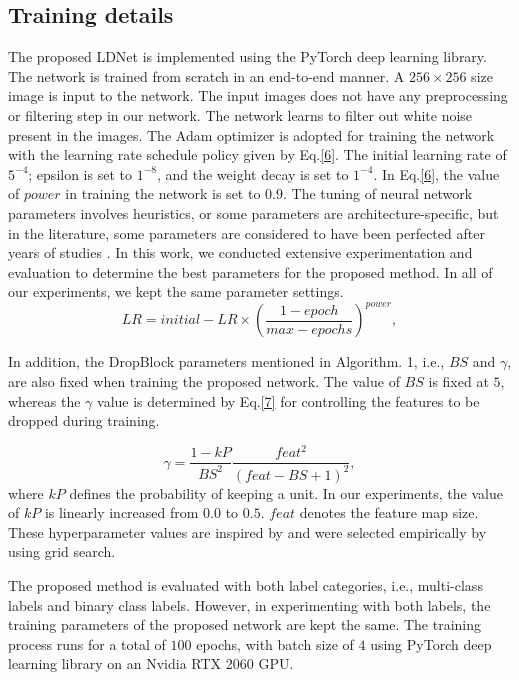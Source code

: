 \documentclass[journal]{IEEEtran}
\begin{document}
\subsection{Training details}
The proposed LDNet is implemented using the PyTorch deep learning library. The network is trained from scratch in an end-to-end manner. A $256 \times 256$ size image is input to the network. The input images does not have any preprocessing or filtering step in our network. The network learns to filter out white noise present in the images.  
The Adam optimizer is adopted for training the network with the learning rate schedule policy given by Eq.\ref{6}. The initial learning rate of $5^{-4}$; epsilon is set to $1^{-8}$, and the weight decay is set to $1^{-4}$. In Eq.\ref{6}, the value of $power$ in training the network is set to $0.9$. The tuning of neural network parameters involves heuristics, or some parameters are architecture-specific, but in the literature, 
some parameters are considered to have been perfected after years of studies
. In this work, we conducted extensive experimentation and evaluation to determine the best parameters for the proposed method. In all of our experiments, we kept the same parameter settings.
\begin{equation}
LR=initial-LR \times (\frac{1-epoch}{max-epochs})^{power},
\label{6}
\end{equation} 
\par
In addition, the DropBlock parameters mentioned in Algorithm. 1, i.e., $BS$ and $\gamma$, are also fixed when training the proposed network. The value of $BS$ is fixed at $5$, whereas the $\gamma$ value is determined by Eq.\ref{7} for controlling the features to be dropped during training.

\begin{equation}
\gamma =\frac{1-kP}{BS^2}\frac{feat^2}{(feat-BS+1)^2},
\label{7}
\end{equation}
where $kP$ defines the probability of keeping a unit. In our experiments, the value of $kP$ is linearly increased from $0.0$ to $0.5$. $feat$ denotes the feature map size. These hyperparameter values are inspired by \cite{DB} and were selected empirically by using grid search. 

The proposed method is evaluated with both label categories, i.e., multi-class labels and binary class labels. However, in experimenting with both labels, the training parameters of the proposed network are kept the same. The training process runs for a total of $100$ epochs, with batch size of $4$ using PyTorch deep learning library on an Nvidia RTX 2060 GPU.
\end{document}
